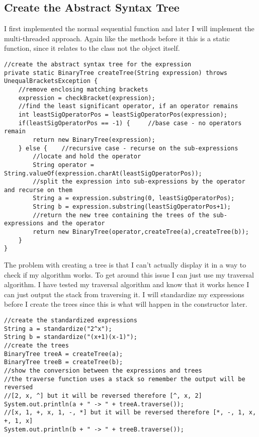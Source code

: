 \documentclass[../../../../main.tex]{subfiles}
\begin{document}
\subsection{Create the Abstract Syntax Tree}
I first implemented the normal sequential function and later I will implement the multi-threaded approach. Again like the methods before it this is a static function, since it relates to the class not the object itself.
\begin{verbatim}
//create the abstract syntax tree for the expression
private static BinaryTree createTree(String expression) throws UnequalBracketsException {
	//remove enclosing matching brackets
	expression = checkBracket(expression);
	//find the least significant operator, if an operator remains
	int leastSigOperatorPos = leastSigOperatorPos(expression);
	if(leastSigOperatorPos == -1) {		//base case - no operators remain
		return new BinaryTree(expression);
	} else {	//recursive case - recurse on the sub-expressions
		//locate and hold the operator
		String operator = String.valueOf(expression.charAt(leastSigOperatorPos));
		//split the expression into sub-expressions by the operator and recurse on them
		String a = expression.substring(0, leastSigOperatorPos);
		String b = expression.substring(leastSigOperatorPos+1);
		//return the new tree containing the trees of the sub-expressions and the operator
		return new BinaryTree(operator,createTree(a),createTree(b));
	}
}
\end{verbatim}
The problem with creating a tree is that I can't actually display it in a way to check if my algorithm works. To get around this issue I can just use my traversal algorithm. I have tested my traversal algorithm and know that it works hence I can just output the stack from traversing it. I will standardize my expressions before I create the trees since this is what will happen in the constructor later.
\begin{verbatim}
//create the standardized expressions
String a = standardize("2^x");
String b = standardize("(x+1)(x-1)");
//create the trees
BinaryTree treeA = createTree(a);
BinaryTree treeB = createTree(b);
//show the conversion between the expressions and trees
//the traverse function uses a stack so remember the output will be reversed
//[2, x, ^] but it will be reversed therefore [^, x, 2]
System.out.println(a + " -> " + treeA.traverse());
//[x, 1, +, x, 1, -, *] but it will be reversed therefore [*, -, 1, x, +, 1, x]
System.out.println(b + " -> " + treeB.traverse());
\end{verbatim}
\end{document}
